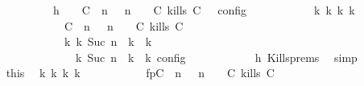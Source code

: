 \begin{isabellebody}
\ \ \ \ \ \ \isamarkupfalse%
\ {\isacharminus}\isanewline
\ \ \ \ \ \ \ \ \isamarkupfalse%
\ h{}{\isacharcolon}\ {\isacartoucheopen}{\isasymrho}\ {\isasymin}\ {\isasymlbrakk}\ {\isacharparenleft}{\isacharparenleft}C\ {\isasymnot}{\isasymUp}\ n{\isacharparenright}\ {\isacharhash}\ {\isasymGamma}{\isacharparenright}{\isacharcomma}\ n\ {\isasymturnstile}\ {\isasymPsi}\ {\isasymtriangleright}\ {\isacharparenleft}{\isacharparenleft}C\ kills\ C\ {\isacharhash}\ {\isasymPhi}{\isacharparenright}\ {\isasymrbrakk}\isactrlsub c\isactrlsub o\isactrlsub n\isactrlsub f\isactrlsub i\isactrlsub g{\isacartoucheclose}\isanewline
\ \ \ \ \ \ \ \ \isamarkupfalse%
\ \isamarkupfalse%
\ {\isacartoucheopen}{\isasymexists}{\isasymGamma}\isactrlsub k\ {\isasymPsi}\isactrlsub k\ {\isasymPhi}\isactrlsub k\ k{\isachardot}\isanewline
\ \ \ \ \ \ \ \ \ \ \ \ \ \ \ \ \ \ \ \ {\isacharparenleft}{\isacharparenleft}{\isacharparenleft}{\isacharparenleft}C\ {\isasymnot}{\isasymUp}\ n{\isacharparenright}\ {\isacharhash}\ {\isasymGamma}{\isacharparenright}{\isacharcomma}\ n\ {\isasymturnstile}\ {\isasymPsi}\ {\isasymtriangleright}\ {\isacharparenleft}{\isacharparenleft}C\ kills\ C\ {\isacharhash}\ {\isasymPhi}{\isacharparenright}{\isacharparenright}\isanewline
\ \ \ \ \ \ \ \ \ \ \ \ \ \ \ \ \ \ \ \ {\isasymhookrightarrow}\isactrlbsup k\isactrlesup \ {\isacharparenleft}{\isasymGamma}\isactrlsub k{\isacharcomma}\ Suc\ n\ {\isasymturnstile}\ {\isasymPsi}\isactrlsub k\ {\isasymtriangleright}\ {\isasymPhi}\isactrlsub k{\isacharparenright}{\isacharparenright}\isanewline
\ \ \ \ \ \ \ \ \ \ \ \ \ \ \ \ \ \ {\isasymand}\ {\isasymrho}\ {\isasymin}\ {\isasymlbrakk}\ {\isasymGamma}\isactrlsub k{\isacharcomma}\ Suc\ n\ {\isasymturnstile}\ {\isasymPsi}\isactrlsub k\ {\isasymtriangleright}\ {\isasymPhi}\isactrlsub k\ {\isasymrbrakk}\isactrlsub c\isactrlsub o\isactrlsub n\isactrlsub f\isactrlsub i\isactrlsub g{\isacartoucheclose}\isanewline
\ \ \ \ \ \ \ \ \ \ \isamarkupfalse%
\ h{}\ Kills{\isachardot}prems\ \isamarkupfalse%
\ simp\isanewline
\ \ \ \ \ \ \ \ \isamarkupfalse%
\ this\ \isamarkupfalse%
\ {\isasymGamma}\isactrlsub k\ {\isasymPsi}\isactrlsub k\ {\isasymPhi}\isactrlsub k\ k\ \isanewline
\ \ \ \ \ \ \ \ \ \ fp{\isacharcolon}{\isacartoucheopen}{\isacharparenleft}{\isacharparenleft}{\isacharparenleft}{\isacharparenleft}C\ {\isasymnot}{\isasymUp}\ n{\isacharparenright}\ {\isacharhash}\ {\isasymGamma}{\isacharparenright}{\isacharcomma}\ n\ {\isasymturnstile}\ {\isasymPsi}\ {\isasymtriangleright}\ {\isacharparenleft}{\isacharparenleft}C\ kills\ C\ {\isacharhash}\ {\isasymPhi}{\isacharparenright}{\isacharparenright}\isanewline

\end{isabellebody}
